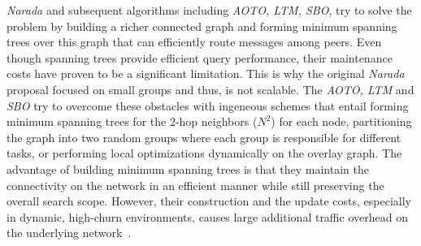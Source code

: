 \emph{Narada} and subsequent algorithms including 
\emph{AOTO, LTM, SBO}, try to solve the problem
by building a richer connected graph and forming 
minimum spanning trees over
this graph that can efficiently route messages among peers. 
Even though spanning trees provide efficient query performance, 
their maintenance costs have proven to be a significant limitation. 
This is why the original \emph{Narada} proposal
focused on small groups and thus, is not scalable.  
The \emph{AOTO, LTM} and \emph{SBO} try to 
overcome these obstacles with 
ingeneous schemes
that entail forming minimum spanning trees
for the $2$-hop neighbors ($N^2$) for each node, 
partitioning the graph into two
random groups where each group is responsible for different tasks, 
or performing local optimizations dynamically on the overlay graph. 
The advantage of building minimum spanning trees is that 
they maintain the connectivity on the network in
an efficient manner while still preserving the overall search scope. 
However, their construction and the update costs, 
especially in dynamic, high-churn environments, 
causes large additional traffic overhead on the underlying
network~\cite{CRZ2000,CRSZ2001,CRSZ2002}.

